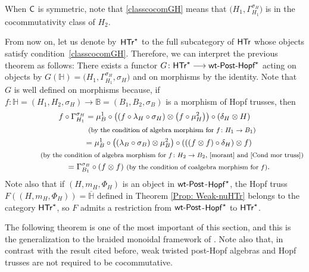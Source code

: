 \documentclass[10pt,a4paper]{amsart}
\numberwithin{equation}{section}
\begin{document}
\begin{Remark}
When $\sf{C}$ is symmetric, note that \eqref{classcocomGH} means that $\bigl(H_{1},\Gamma_{H_{1}}^{\sigma_{H}}\bigr)$ is in the cocommutativity class of $H_{2}$.
\end{Remark}
From now on, let us denote by~$\sf{HTr}^{\star}$ to the full subcategory of $\sf{HTr}$ whose objects satisfy condition~\eqref{classcocomGH}. Therefore, we can interpret the previous theorem as follows: There exists a functor
$G\colon \sf{HTr}^{\star}\longrightarrow \textnormal{{\sf wt}-{\sf Post}-{\sf Hopf}}^{\star}$
acting on objects by $G(\mathbb{H})=\bigl(H_{1},\Gamma_{H_{1}}^{\sigma_{H}},\sigma_{H}\bigr)$ and on morphisms by the identity. Note that $G$ is well defined on morphisms because, if $f\colon \mathbb{H}=(H_{1},H_{2},\sigma_{H})\rightarrow \mathbb{B}=(B_{1},B_{2},\sigma_{B})$ is a morphism of Hopf trusses, then
\begin{gather}
 f\circ\Gamma_{H_{1}}^{\sigma_{H}} = \mu_{B}^{1}\circ\bigl((f\circ\lambda_{H}\circ\sigma_{H})\otimes\bigl(f\circ \mu_{H}^{2}\bigr)\bigr)\circ(\delta_{H}\otimes H)\nonumber\\
\hphantom{f\circ\Gamma_{H_{1}}^{\sigma_{H}}=}{}
\text{\footnotesize\textnormal{(by the condition of algebra morphism for $f\colon H_{1}\rightarrow B_{1}$)}}\nonumber\\ \hphantom{f\circ\Gamma_{H_{1}}^{\sigma_{H}}}{}
= \mu_{B}^{1}\circ\bigl((\lambda_{B}\circ\sigma_{B})\otimes\mu_{B}^{2}\bigr)\circ(((f\otimes f)\circ\delta_{H})\otimes f)\nonumber\\ \hphantom{f\circ\Gamma_{H_{1}}^{\sigma_{H}}=}{}
 \text{\footnotesize\textnormal{(by the condition of algebra morphism for $f\colon H_{2}\rightarrow B_{2}$, \eqref{morant} and \eqref{Cond mor truss})}}\nonumber\\ \hphantom{f\circ\Gamma_{H_{1}}^{\sigma_{H}}}{}
= \Gamma_{B_{1}}^{\sigma_{B}}\circ(f\otimes f)\ \text{\footnotesize\textnormal{(by the condition of coalgebra morphism for $f$)}}.\label{gammatrussf}
\end{gather}
Note also that if $(H,m_{H},\Phi_{H})$ is an object in ${\sf wt}\textnormal{-}{\sf Post}$-${\sf Hopf}^{\star}$, the Hopf truss $F((H,m_{H},\Phi_{H}))=\overline{\mathbb{H}}$ defined in Theorem \ref{Prop: Weak-nuHTr} belongs to the category $\sf{HTr}^{\star}$, so $F$ admits a restriction from ${\sf wt}\textnormal{-}{\sf Post}$-${\sf Hopf}^{\star}$ to $\sf{HTr}^{\star}$.

The following theorem is one of the most important of this section, and this is the generalization to the braided monoidal framework of \cite[Theorem 6.7]{Wang}. Note also that, in contrast with the result cited before, weak twisted post-Hopf algebras and Hopf trusses are not required to be cocommutative.
\end{document}
